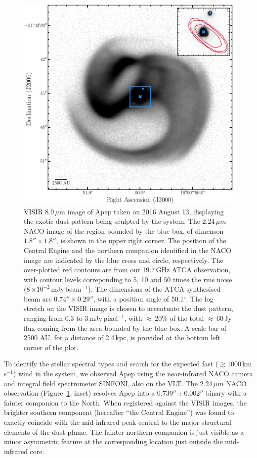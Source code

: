 \documentclass[preprint,times]{aastex61}
\begin{document}
\begin{figure}
\begin{center}
\includegraphics[scale=0.55]{visir_89_gray_log_scalebar.eps}
 \caption{VISIR 8.9\,$\mu$m image of Apep taken on 2016 August 13, displaying the exotic dust pattern being sculpted by the system. The 2.24\,$\mu m$ NACO image of the region bounded by the blue box, of dimenson $1.8'' \times 1.8''$, is shown in the upper right corner. The position of the Central Engine and the northern companion identified in the NACO image are indicated by the blue cross and circle, respectively. The over-plotted red contours are from our 19.7\,GHz ATCA observation, with contour levels correponding to 5, 10 and 50 times the rms noise (8\,$\times 10^{-2}$\,mJy\,beam$^{-1}$). The dimensions of the ATCA synthesised beam are $0.74'' \times 0.29''$, with a position angle of 50.1$^{\circ}$. The log stretch on the VISIR image is chosen to accentuate the dust pattern, ranging from 0.3 to 3\,mJy\,pixel$^{-1}$, with $\approx$\,20\% of the total $\approx$\,60\,Jy flux coming from the area bounded by the blue box. A scale bar of 2500 AU, for a distance of 2.4\,kpc, is provided at the bottom left corner of the plot.}
\label{fig:visir_img}
\end{center}
\end{figure}

To identify the stellar spectral types and search for the expected fast ($\gtrsim 1000$\,km\,s$^{-1}$) wind in the system, we observed Apep using the near-infrared NACO camera and integral field spectrometer SINFONI, also on the VLT. The 2.24\,$\mu m$ NACO observation (Figure~\ref{fig:visir_img}, inset) resolves Apep into a 0.739$''$\,$\pm$\,0.002$''$ binary with a fainter companion to the North. When registered against the VISIR images, the brighter southern component (hereafter ``the Central Engine'') was found to exactly coincide with the mid-infrared peak central to the major structural elements of the dust plume. The fainter northern companion is just visible as a minor asymmetric feature at the corresponding location just outside the mid-infrared core.
\end{document}
